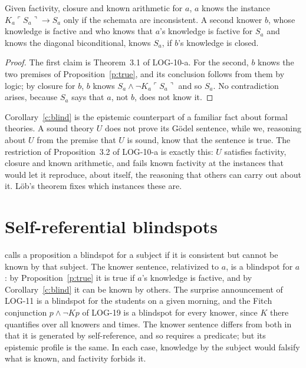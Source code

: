 \documentclass{situationist-preprint}
\begin{document}
\begin{corollary}\label{c:blind}
Given factivity, closure and known arithmetic for $a$, $a$ knows the instance $K_a\ulcorner S_a\urcorner \rightarrow S_a$ only if the schemata are inconsistent. A second knower $b$, whose knowledge is factive and who knows that $a$'s knowledge is factive for $S_a$ and knows the diagonal biconditional, knows $S_a$, if $b$'s knowledge is closed.
\end{corollary}

\begin{proof}
The first claim is Theorem~3.1 of LOG-10-a. For the second, $b$ knows the two premises of Proposition~\ref{p:true}, and its conclusion follows from them by logic; by closure for $b$, $b$ knows $S_a \wedge \neg K_a\ulcorner S_a\urcorner$ and so $S_a$. No contradiction arises, because $S_a$ says that $a$, not $b$, does not know it.
\end{proof}

Corollary~\ref{c:blind} is the epistemic counterpart of a familiar fact about formal theories. A sound theory $U$ does not prove its Gödel sentence, while we, reasoning about $U$ from the premise that $U$ is sound, know that the sentence is true. The restriction of Proposition~3.2 of LOG-10-a is exactly this: $U$ satisfies factivity, closure and known arithmetic, and fails known factivity at the instances that would let it reproduce, about itself, the reasoning that others can carry out about it. Löb's theorem \citep{Lob1955} fixes which instances these are.

\section{Self-referential blindspots}

\citet{Sorensen1988} calls a proposition a blindspot for a subject if it is consistent but cannot be known by that subject. The knower sentence, relativized to $a$, is a blindspot for $a$: by Proposition~\ref{p:true} it is true if $a$'s knowledge is factive, and by Corollary~\ref{c:blind} it can be known by others. The surprise announcement of LOG-11 is a blindspot for the students on a given morning, and the Fitch conjunction $p \wedge \neg Kp$ of LOG-19 is a blindspot for every knower, since $K$ there quantifies over all knowers and times. The knower sentence differs from both in that it is generated by self-reference, and so requires a predicate; but its epistemic profile is the same. In each case, knowledge by the subject would falsify what is known, and factivity forbids it.
\end{document}
